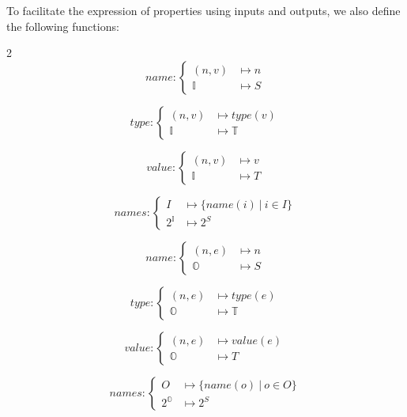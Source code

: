 \documentclass{article}
\begin{document}
To facilitate the expression of properties using inputs and outputs, we also define the following functions:
\begin{multicols}{2}
\begin{equation*}
name :
\begin{cases}
(n,v)&\longmapsto n \\
\mathbb{I} &\longmapsto S
\end{cases}
\end{equation*}

\begin{equation*}
type :
\begin{cases}
(n,v)&\longmapsto type(v) \\
\mathbb{I} &\longmapsto \mathbb{T}
\end{cases}
\end{equation*}

\begin{equation*}
value :
\begin{cases}
(n,v)&\longmapsto v \\
\mathbb{I} &\longmapsto T
\end{cases}
\end{equation*}

\begin{equation*}
names :
\begin{cases}
I           &\longmapsto \{name(i)~|~ i \in I\} \\
2^\mathbb{I}&\longmapsto 2^S 
\end{cases}
\end{equation*}

\begin{equation*}
name :
\begin{cases}
(n,e)&\longmapsto n \\
\mathbb{O} &\longmapsto S
\end{cases}
\end{equation*}

\begin{equation*}
type :
\begin{cases}
(n,e)&\longmapsto type(e)\\
\mathbb{O} &\longmapsto \mathbb{T}
\end{cases}
\end{equation*}

\begin{equation*}
value :
\begin{cases}
(n,e)&\longmapsto value(e) \\
\mathbb{O} &\longmapsto T
\end{cases}
\end{equation*}

\begin{equation*}
names :
\begin{cases}
O           &\longmapsto \{name(o)~|~o \in O\} \\
2^\mathbb{O}&\longmapsto 2^S 
\end{cases}
\end{equation*}
\end{multicols}
\end{document}
